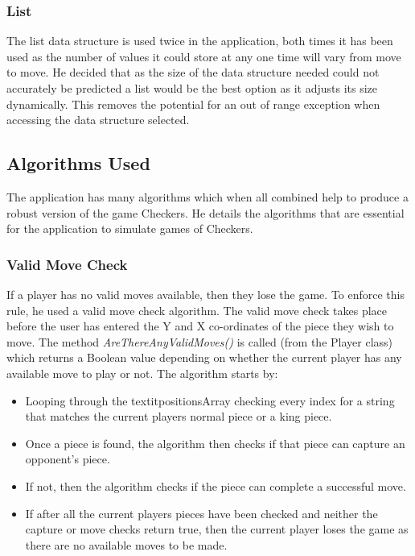 \documentclass[10pt, a4paper]{article}
\begin{document}
 
 \subsubsection{List}
 The list data structure is used twice in the application, both times it has been used as the number of values it could store at any one time will vary from move to move. He decided that as the size of the data structure needed could not accurately be predicted a list would be the best option as it adjusts its size dynamically. This removes the potential for an out of range exception when accessing the data structure selected.
 
 
 
 \subsection{Algorithms Used}
 The application has many algorithms which when all combined help to produce a robust version of the game Checkers. He details the algorithms that are essential for the application to simulate games of Checkers.
 
 \subsubsection{Valid Move Check}
 If a player has no valid moves available, then they lose the game. To enforce this rule, he used a valid move check algorithm. The valid move check takes place before the user has entered the Y and X co-ordinates of the piece they wish to move. The method \textit{AreThereAnyValidMoves()} is called (from the Player class) which returns a Boolean value depending on whether the current player has any available move to play or not.
 \newline
 The algorithm starts by:  
 
 
 \begin{itemize}
 	\item Looping through the textit{positionsArray} checking every index for a string that matches the current players normal piece or a king piece.  
 	\item Once a piece is found, the algorithm then checks if that piece can capture an opponent's piece.
 	\item If not, then the algorithm checks if the piece can complete a successful move. 
 	\item If after all the current players pieces have been checked and neither the capture or move checks return true, then the current player loses the game as there are no available moves to be made. 
 \end{itemize}
 
\end{document}
